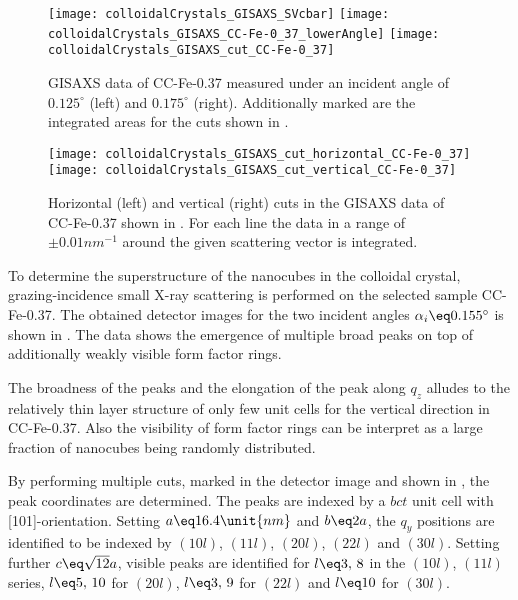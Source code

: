 \documentclass[\main/dresen_thesis.tex]{subfiles}
\begin{document}
  \label{sec:colloidalCrystals:layers:gisaxs}
  \begin{figure}[tb]
    \centering
    \texttt{[image: colloidalCrystals\_GISAXS\_SVcbar]}
    \texttt{[image: colloidalCrystals\_GISAXS\_CC-Fe-0\_37\_lowerAngle]}
    \texttt{[image: colloidalCrystals\_GISAXS\_cut\_CC-Fe-0\_37]}
    \caption{\label{fig:colloidalCrystals:layers:gisaxs}GISAXS data of CC-Fe-0.37 measured under an incident angle of $0.125 ^\circ$ (left) and $0.175 ^\circ$ (right). Additionally marked are the integrated areas for the cuts shown in .}
  \end{figure}

  \begin{figure}[tb]
    \centering
    \texttt{[image: colloidalCrystals\_GISAXS\_cut\_horizontal\_CC-Fe-0\_37]}
    \texttt{[image: colloidalCrystals\_GISAXS\_cut\_vertical\_CC-Fe-0\_37]}
    \caption{\label{fig:colloidalCrystals:layers:gisaxsCuts}Horizontal (left) and vertical (right) cuts in the GISAXS data of CC-Fe-0.37 shown in . For each line the data in a range of $\pm 0.01 \unit{nm^{-1}}$ around the given scattering vector is integrated.}
  \end{figure}

  To determine the superstructure of the nanocubes in the colloidal crystal, grazing-incidence small X-ray scattering is performed on the selected sample CC-Fe-0.37.
  The obtained detector images for the two incident angles $\alpha_i \eq 0.155^\circ$ is shown in .
  The data shows the emergence of multiple broad peaks on top of additionally  weakly visible form factor rings.

  The broadness of the peaks and the elongation of the peak along $q_z$ alludes to the relatively thin layer structure of only few unit cells for the vertical direction in CC-Fe-0.37.
  Also the visibility of form factor rings can be interpret as a large fraction of nanocubes being randomly distributed.

  By performing multiple cuts, marked in the detector image and shown in , the peak coordinates are determined.
  The peaks are indexed by a $bct$ unit cell with [101]-orientation.
  Setting $a \eq 16.4 \unit{nm}$ and $b \eq 2a$, the $q_y$ positions are identified to be indexed by $(10l)$, $(11l)$, $(20l)$, $(22l)$ and $(30l)$.
  Setting further $c \eq \sqrt{12} a$, visible peaks are identified for $l\eq 3,\, 8$ in the $(10l)$, $(11l)$ series, $l \eq 5, \, 10$ for $(20l)$, $l \eq 3,\, 9$ for $(22l)$ and $l\eq 10$ for $(30l)$.
\end{document}
